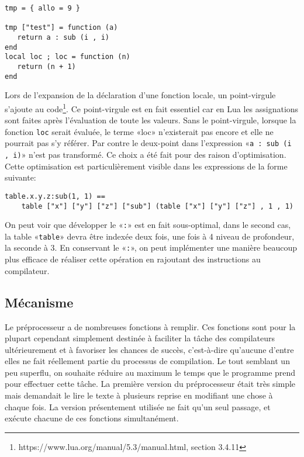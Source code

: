 \documentclass{article}
\begin{document}
\newpage
\begin{lstlisting}[belowcaptionskip = -1\baselineskip]
tmp = { allo = 9 } 

tmp ["test"] = function (a) 
   return a : sub (i , i) 
end 
local loc ; loc = function (n) 
   return (n + 1) 
end 
\end{lstlisting}

Lors de l'expansion de la déclaration d'une fonction locale, un point-virgule s'ajoute au code\footnote{https://www.lua.org/manual/5.3/manual.html, section 3.4.11}. Ce point-virgule est en fait essentiel car en Lua les assignations sont faites après l'évaluation de toute les valeurs. Sans le point-virgule, lorsque la fonction \texttt{loc} serait évaluée, le terme «loc» n'existerait pas encore et elle ne pourrait pas s'y référer. Par contre le deux-point dans l'expression «\texttt{a : sub (i , i)}» n'est pas transformé. Ce choix a été fait pour des raison d'optimisation. Cette optimisation est particulièrement visible dans les expressions de la forme suivante:
\begin{lstlisting}[caption={Développement sous-optimal},label=DescriptiveLabel]
table.x.y.z:sub(1, 1) ==
	table ["x"] ["y"] ["z"] ["sub"] (table ["x"] ["y"] ["z"] , 1 , 1)
\end{lstlisting}

On peut voir que développer le «\texttt{:}» est en fait sous-optimal, dans le second cas, la table «\texttt{table}» devra être indexée deux fois, une fois à 4 niveau de profondeur, la seconde à 3. En conservant le «\texttt{:}», on peut implémenter une manière beaucoup plus efficace de réaliser cette opération en rajoutant des instructions au compilateur.

\newpage
\subsection{Mécanisme}
Le préprocesseur a de nombreuses fonctions à remplir. Ces fonctions sont pour la plupart cependant simplement destinée à faciliter la tâche des compilateurs ultérieurement et à favoriser les chances de succès, c'est-à-dire qu'aucune d'entre elles ne fait réellement partie du processus de compilation. Le tout semblant un peu superflu, on souhaite réduire au maximum le temps que le programme prend pour effectuer cette tâche. La première version du préprocesseur était très simple mais demandait le lire le texte à plusieurs reprise en modifiant une chose à chaque fois. La version présentement utilisée ne fait qu'un seul passage, et exécute chacune de ces fonctions simultanément.
\end{document}
